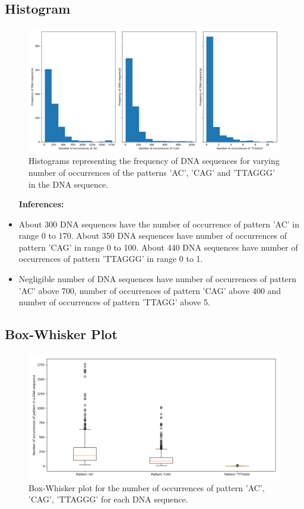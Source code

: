 \documentclass{article}
\begin{document}
		\vspace{54pt}
		\subsection{Histogram}
		
			\begin{figure}[!htbp]
				\centering
				\includegraphics[scale=0.4]{charts/Figure_6}
				\caption{Histograms representing the frequency of DNA sequences for varying number of occurrences of the patterns 'AC', 'CAG' and 'TTAGGG' in the DNA sequence.}
			\end{figure}
			
			\begin{itemize}\itemsep1pt
				\item [\textbf{Inferences:}]
				\item About 300 DNA sequences have the number of occurrence of pattern 'AC' in range 0 to 170. About 350 DNA sequences have number of occurrences of pattern 'CAG' in range 0 to 100. About 440 DNA sequences have number of occurrences of pattern 'TTAGGG' in range 0 to 1.
				\item Negligible number of DNA sequences have number of occurrences of pattern 'AC' above 700, number of occurrences of pattern 'CAG' above 400 and number of occurrences of pattern 'TTAGG' above 5.
			\end{itemize}
		
				\subsection{Box-Whisker Plot}
			
			\begin{figure}[!htbp]
				\centering
				\includegraphics[scale=0.4]{charts/Figure_7}
				\caption{Box-Whisker plot for the number of occurrences of pattern 'AC', 'CAG', 'TTAGGG' for each DNA sequence.}
			\end{figure}
			
\end{document}
